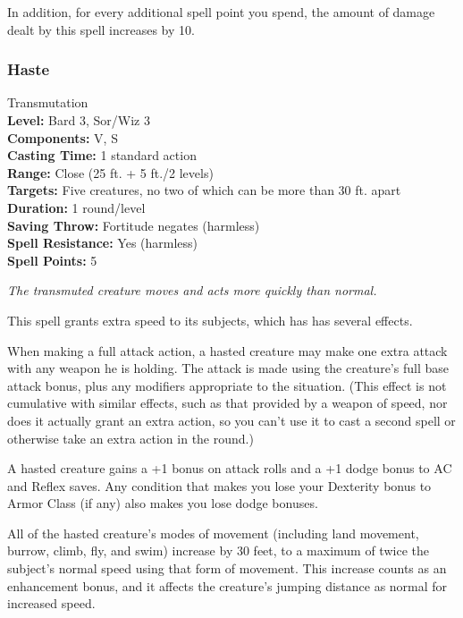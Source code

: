 In addition, for every additional spell point you spend, the amount of damage dealt by this spell increases by 10.
\subsubsection{Haste}
\label{Spell:Haste}
Transmutation
\\ \textbf{Level:} Bard 3, Sor/Wiz 3
\\ \textbf{Components:} V, S
\\ \textbf{Casting Time:} 1 standard action
\\ \textbf{Range:} Close (25 ft. + 5 ft./2 levels)
\\ \textbf{Targets:} Five creatures, no two of which can be more than 30 ft. apart
\\ \textbf{Duration:} 1 round/level
\\ \textbf{Saving Throw:} Fortitude negates (harmless)
\\ \textbf{Spell Resistance:} Yes (harmless)
\\ \textbf{Spell Points:} 5

\emph{The transmuted creature moves and acts more quickly than normal.} 

This spell grants extra speed to its subjects, which has has several effects.

When making a full attack action, a hasted creature may make one extra attack with any weapon he is holding. 
The attack is made using the creature's full base attack bonus, plus any modifiers appropriate to the situation. 
(This effect is not cumulative with similar effects, such as that provided by a weapon of speed, nor does it actually grant an extra action, so you can't use it to cast a second spell or otherwise take an extra action in the round.)

A hasted creature gains a +1 bonus on attack rolls and a +1 dodge bonus to AC and Reflex saves. 
Any condition that makes you lose your Dexterity bonus to Armor Class (if any) also makes you lose dodge bonuses.

All of the hasted creature's modes of movement (including land movement, burrow, climb, fly, and swim) increase by 30 feet, to a maximum of twice the subject's normal speed using that form of movement. 
This increase counts as an enhancement bonus, and it affects the creature's jumping distance as normal for increased speed.


